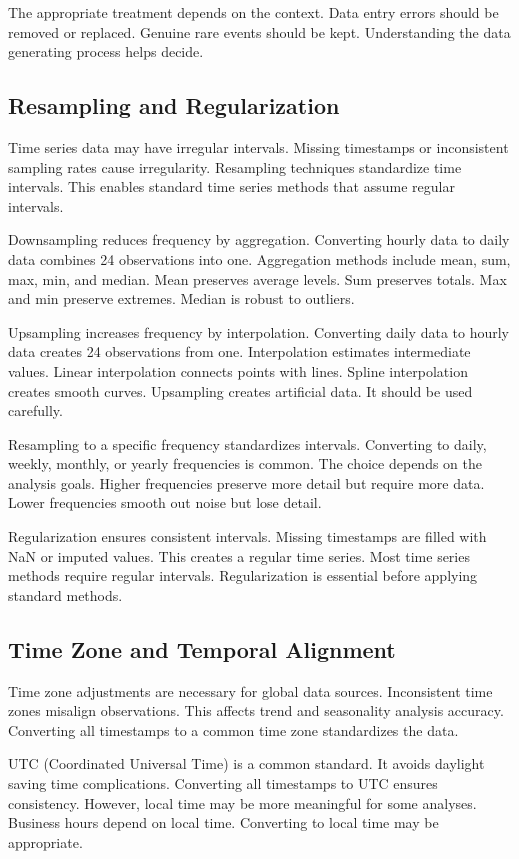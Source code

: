 The appropriate treatment depends on the context. Data entry errors should be removed or replaced. Genuine rare events should be kept. Understanding the data generating process helps decide.

\subsection{Resampling and Regularization}

Time series data may have irregular intervals. Missing timestamps or inconsistent sampling rates cause irregularity. Resampling techniques standardize time intervals. This enables standard time series methods that assume regular intervals.

Downsampling reduces frequency by aggregation. Converting hourly data to daily data combines 24 observations into one. Aggregation methods include mean, sum, max, min, and median. Mean preserves average levels. Sum preserves totals. Max and min preserve extremes. Median is robust to outliers.

Upsampling increases frequency by interpolation. Converting daily data to hourly data creates 24 observations from one. Interpolation estimates intermediate values. Linear interpolation connects points with lines. Spline interpolation creates smooth curves. Upsampling creates artificial data. It should be used carefully.

Resampling to a specific frequency standardizes intervals. Converting to daily, weekly, monthly, or yearly frequencies is common. The choice depends on the analysis goals. Higher frequencies preserve more detail but require more data. Lower frequencies smooth out noise but lose detail.

Regularization ensures consistent intervals. Missing timestamps are filled with NaN or imputed values. This creates a regular time series. Most time series methods require regular intervals. Regularization is essential before applying standard methods.

\subsection{Time Zone and Temporal Alignment}

Time zone adjustments are necessary for global data sources. Inconsistent time zones misalign observations. This affects trend and seasonality analysis accuracy. Converting all timestamps to a common time zone standardizes the data.

UTC (Coordinated Universal Time) is a common standard. It avoids daylight saving time complications. Converting all timestamps to UTC ensures consistency. However, local time may be more meaningful for some analyses. Business hours depend on local time. Converting to local time may be appropriate.

